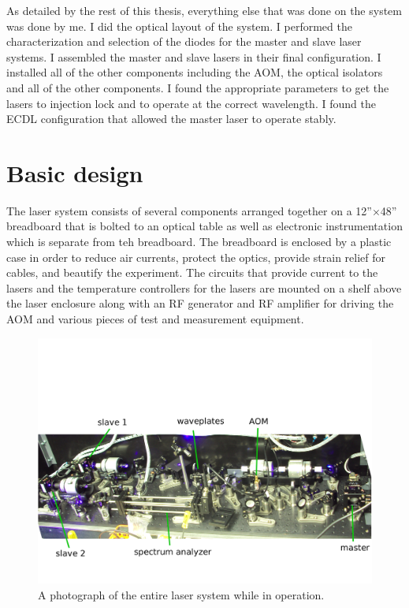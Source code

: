 As detailed by the rest of this thesis, everything else that was done on the system was done by me. I did the optical layout of the system. I performed the characterization and selection of the diodes for the master and slave laser systems. I assembled the master and slave lasers in their final configuration. I installed all of the other components including the AOM, the optical isolators and all of the other components. I found the appropriate parameters to get the lasers to injection lock and to operate at the correct wavelength. I found the ECDL configuration that allowed the master laser to operate stably.

\section{Basic design}
The laser system consists of several components arranged together on a 12''$\times$48'' breadboard that is bolted to an optical table as well as electronic instrumentation which is separate from teh breadboard. The breadboard is enclosed by a plastic case in order to reduce air currents, protect the optics, provide strain relief for cables, and beautify the experiment. The circuits that provide current to the lasers and the temperature controllers for the lasers are mounted on a shelf above the laser enclosure along with an RF generator and RF amplifier for driving the AOM and various pieces of test and measurement equipment.  
\begin{figure}
    \centerline{\includegraphics[width=1\textwidth]{entire_setup}}
    \caption[Photo of entire laser system]{\label{fullexperimentphoto}
A photograph of the entire laser system while in operation.
    }
\end{figure}

